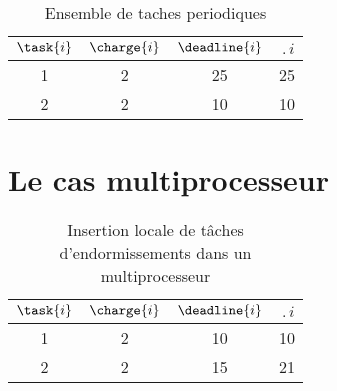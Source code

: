 \begin{table}[!h]
\begin{center}
\begin{tabular}{|c|c|c|c|}
 \hline$\task{i}$ & $\charge{i}$ & $\deadline{i}$ & $\period{i}$ \\ 
 \hline 1 & 2 & 25 & 25 \\ 
 \hline 2 & 2 & 10 & 10 \\ 
 \hline 
 \end{tabular}
\end{center}
\caption{Ensemble de taches periodiques} \label{tab:exempleedfmp}
\end{table}







\section{Le cas multiprocesseur}

%
%

\begin{table}[h]
\begin{center}
\begin{tabular}{|c|c|c|c|}
 \hline$\task{i}$ & $\charge{i}$ & $\deadline{i}$ & $\period{i}$ \\ 
 \hline1 & 2 & 10 & 10 \\ 
 \hline 2 & 2 & 15 & 21 \\ 
 \hline 
 \end{tabular}
\end{center}
\caption{Insertion locale de tâches d'endormissements dans un multiprocesseur} \label{tab:edfmp}
\end{table}
